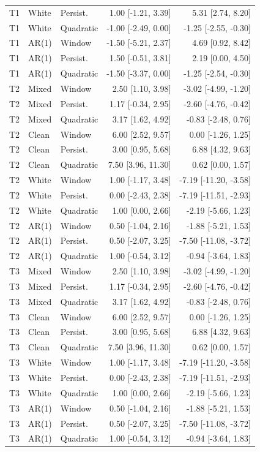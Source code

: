 \documentclass[10pt]{article}
\begin{document}
\begin{longtable}{lllrr}
T1 & White & Persist. & 1.00 [-1.21, 3.39] & 5.31 [2.74, 8.20] \\
T1 & White & Quadratic & -1.00 [-2.49, 0.00] & -1.25 [-2.55, -0.30] \\
T1 & AR(1) & Window & -1.50 [-5.21, 2.37] & 4.69 [0.92, 8.42] \\
T1 & AR(1) & Persist. & 1.50 [-0.51, 3.81] & 2.19 [0.00, 4.50] \\
T1 & AR(1) & Quadratic & -1.50 [-3.37, 0.00] & -1.25 [-2.54, -0.30] \\
T2 & Mixed & Window & 2.50 [1.10, 3.98] & -3.02 [-4.99, -1.20] \\
T2 & Mixed & Persist. & 1.17 [-0.34, 2.95] & -2.60 [-4.76, -0.42] \\
T2 & Mixed & Quadratic & 3.17 [1.62, 4.92] & -0.83 [-2.48, 0.76] \\
T2 & Clean & Window & 6.00 [2.52, 9.57] & 0.00 [-1.26, 1.25] \\
T2 & Clean & Persist. & 3.00 [0.95, 5.68] & 6.88 [4.32, 9.63] \\
T2 & Clean & Quadratic & 7.50 [3.96, 11.30] & 0.62 [0.00, 1.57] \\
T2 & White & Window & 1.00 [-1.17, 3.48] & -7.19 [-11.20, -3.58] \\
T2 & White & Persist. & 0.00 [-2.43, 2.38] & -7.19 [-11.51, -2.93] \\
T2 & White & Quadratic & 1.00 [0.00, 2.66] & -2.19 [-5.66, 1.23] \\
T2 & AR(1) & Window & 0.50 [-1.04, 2.16] & -1.88 [-5.21, 1.53] \\
T2 & AR(1) & Persist. & 0.50 [-2.07, 3.25] & -7.50 [-11.08, -3.72] \\
T2 & AR(1) & Quadratic & 1.00 [-0.54, 3.12] & -0.94 [-3.64, 1.83] \\
T3 & Mixed & Window & 2.50 [1.10, 3.98] & -3.02 [-4.99, -1.20] \\
T3 & Mixed & Persist. & 1.17 [-0.34, 2.95] & -2.60 [-4.76, -0.42] \\
T3 & Mixed & Quadratic & 3.17 [1.62, 4.92] & -0.83 [-2.48, 0.76] \\
T3 & Clean & Window & 6.00 [2.52, 9.57] & 0.00 [-1.26, 1.25] \\
T3 & Clean & Persist. & 3.00 [0.95, 5.68] & 6.88 [4.32, 9.63] \\
T3 & Clean & Quadratic & 7.50 [3.96, 11.30] & 0.62 [0.00, 1.57] \\
T3 & White & Window & 1.00 [-1.17, 3.48] & -7.19 [-11.20, -3.58] \\
T3 & White & Persist. & 0.00 [-2.43, 2.38] & -7.19 [-11.51, -2.93] \\
T3 & White & Quadratic & 1.00 [0.00, 2.66] & -2.19 [-5.66, 1.23] \\
T3 & AR(1) & Window & 0.50 [-1.04, 2.16] & -1.88 [-5.21, 1.53] \\
T3 & AR(1) & Persist. & 0.50 [-2.07, 3.25] & -7.50 [-11.08, -3.72] \\
T3 & AR(1) & Quadratic & 1.00 [-0.54, 3.12] & -0.94 [-3.64, 1.83] \\
\bottomrule\end{longtable}\endgroup
\end{document}
